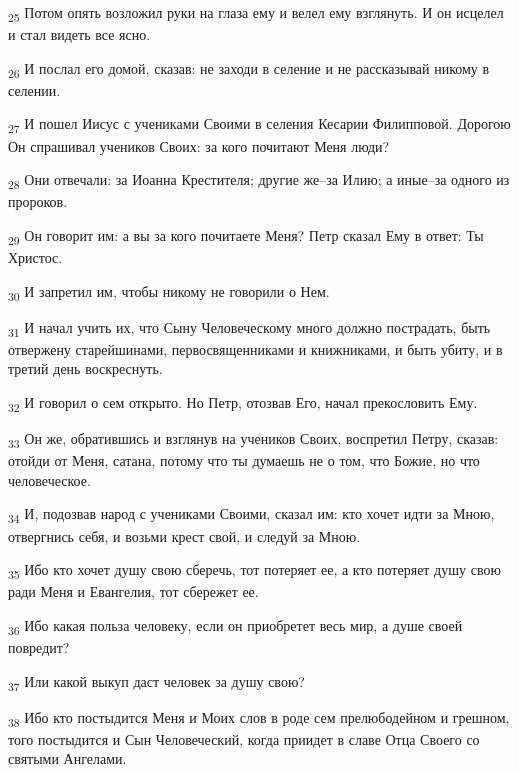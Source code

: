 \begin{tcolorbox}
\textsubscript{25} Потом опять возложил руки на глаза ему и велел ему взглянуть. И он исцелел и стал видеть все ясно.
\end{tcolorbox}
\begin{tcolorbox}
\textsubscript{26} И послал его домой, сказав: не заходи в селение и не рассказывай никому в селении.
\end{tcolorbox}
\begin{tcolorbox}
\textsubscript{27} И пошел Иисус с учениками Своими в селения Кесарии Филипповой. Дорогою Он спрашивал учеников Своих: за кого почитают Меня люди?
\end{tcolorbox}
\begin{tcolorbox}
\textsubscript{28} Они отвечали: за Иоанна Крестителя; другие же--за Илию; а иные--за одного из пророков.
\end{tcolorbox}
\begin{tcolorbox}
\textsubscript{29} Он говорит им: а вы за кого почитаете Меня? Петр сказал Ему в ответ: Ты Христос.
\end{tcolorbox}
\begin{tcolorbox}
\textsubscript{30} И запретил им, чтобы никому не говорили о Нем.
\end{tcolorbox}
\begin{tcolorbox}
\textsubscript{31} И начал учить их, что Сыну Человеческому много должно пострадать, быть отвержену старейшинами, первосвященниками и книжниками, и быть убиту, и в третий день воскреснуть.
\end{tcolorbox}
\begin{tcolorbox}
\textsubscript{32} И говорил о сем открыто. Но Петр, отозвав Его, начал прекословить Ему.
\end{tcolorbox}
\begin{tcolorbox}
\textsubscript{33} Он же, обратившись и взглянув на учеников Своих, воспретил Петру, сказав: отойди от Меня, сатана, потому что ты думаешь не о том, что Божие, но что человеческое.
\end{tcolorbox}
\begin{tcolorbox}
\textsubscript{34} И, подозвав народ с учениками Своими, сказал им: кто хочет идти за Мною, отвергнись себя, и возьми крест свой, и следуй за Мною.
\end{tcolorbox}
\begin{tcolorbox}
\textsubscript{35} Ибо кто хочет душу свою сберечь, тот потеряет ее, а кто потеряет душу свою ради Меня и Евангелия, тот сбережет ее.
\end{tcolorbox}
\begin{tcolorbox}
\textsubscript{36} Ибо какая польза человеку, если он приобретет весь мир, а душе своей повредит?
\end{tcolorbox}
\begin{tcolorbox}
\textsubscript{37} Или какой выкуп даст человек за душу свою?
\end{tcolorbox}
\begin{tcolorbox}
\textsubscript{38} Ибо кто постыдится Меня и Моих слов в роде сем прелюбодейном и грешном, того постыдится и Сын Человеческий, когда приидет в славе Отца Своего со святыми Ангелами.
\end{tcolorbox}
